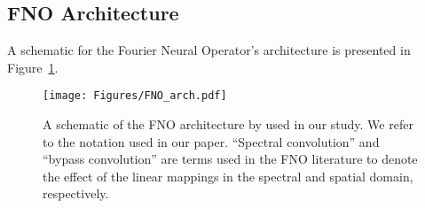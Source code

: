 \subsection{FNO Architecture}
A schematic for the Fourier Neural Operator's architecture is presented in Figure~\ref{fig:fnoArchitecture}.
\begin{figure}[H]
    \centering
    \texttt{[image: Figures/FNO\_arch.pdf]}
    \caption{
    A schematic of the FNO architecture by \citet{li_fourier_2021} used in our study. We refer to the notation used in our paper. ``Spectral convolution'' and ``bypass convolution'' are terms used in the FNO literature to denote the effect of the linear mappings in the spectral and spatial domain, respectively.
    }
    \label{fig:fnoArchitecture}
\end{figure}
